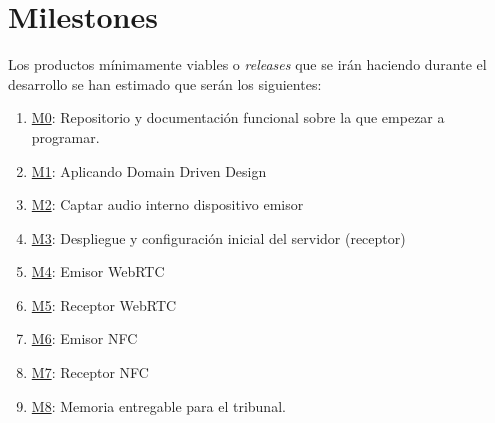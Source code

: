 \section{Milestones}
Los productos mínimamente viables o \emph{releases} que se irán haciendo durante el
desarrollo se han estimado que serán los siguientes:

\begin{enumerate}
    \item \href{https://github.com/migueorg/One-touch-music-streaming-TFG-ETSIIT/milestone/1}{M0}: Repositorio y documentación funcional sobre la que empezar a programar.
    \item \href{https://github.com/migueorg/One-touch-music-streaming-TFG-ETSIIT/milestone/2}{M1}: Aplicando Domain Driven Design
    \item \href{https://github.com/migueorg/One-touch-music-streaming-TFG-ETSIIT/milestone/3}{M2}: Captar audio interno dispositivo emisor
    \item \href{https://github.com/migueorg/One-touch-music-streaming-TFG-ETSIIT/milestone/4}{M3}: Despliegue y configuración inicial del servidor (receptor)
    \item \href{https://github.com/migueorg/One-touch-music-streaming-TFG-ETSIIT/milestone/4}{M4}: Emisor WebRTC
    \item \href{https://github.com/migueorg/One-touch-music-streaming-TFG-ETSIIT/milestone/4}{M5}: Receptor WebRTC
    \item \href{https://github.com/migueorg/One-touch-music-streaming-TFG-ETSIIT/milestone/4}{M6}: Emisor NFC
    \item \href{https://github.com/migueorg/One-touch-music-streaming-TFG-ETSIIT/milestone/4}{M7}: Receptor NFC
    \item \href{https://github.com/migueorg/One-touch-music-streaming-TFG-ETSIIT/milestone/5}{M8}: Memoria entregable para el tribunal.
\end{enumerate}